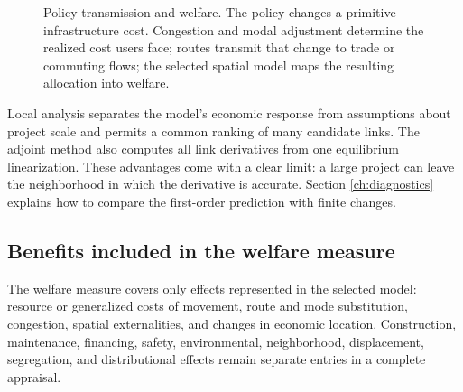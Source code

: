 \begin{figure}[H]
\centering
{}
\caption{Policy transmission and welfare. The policy changes a primitive infrastructure
cost. Congestion and modal adjustment determine the realized cost users face;
routes transmit that change to trade or commuting flows; the selected spatial
model maps the resulting allocation into welfare.}
\label{fig:guide-mechanism}
\end{figure}

Local analysis separates the model's economic response from assumptions about
project scale and permits a common ranking of many candidate links. The
adjoint method also computes all link derivatives from one equilibrium
linearization. These advantages come with a clear limit: a large project can
leave the neighborhood in which the derivative is accurate. Section
\ref{ch:diagnostics} explains how to compare the first-order prediction with
finite changes.

\subsection{Benefits included in the welfare measure}

The welfare measure covers only effects represented in the selected model:
resource or generalized costs of movement, route and mode substitution,
congestion, spatial externalities, and changes in economic location.
Construction, maintenance, financing, safety, environmental, neighborhood,
displacement, segregation, and distributional effects remain separate entries
in a complete appraisal.

